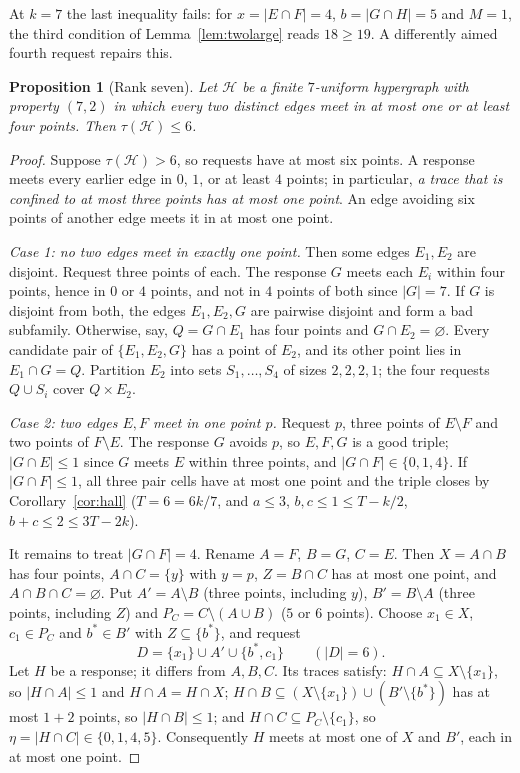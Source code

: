 \documentclass[11pt]{article}
\numberwithin{equation}{section}
\newtheorem{proposition}[theorem]{Proposition}
\theoremstyle{definition}
\theoremstyle{remark}
\newcommand{\HH}{\mathcal H}
\begin{document}
At $k=7$ the last inequality fails: for $x=|E\cap F|=4$, $b=|G\cap H|=5$
and $M=1$, the third condition of Lemma~\ref{lem:twolarge} reads
$18\ge19$. A differently aimed fourth request repairs this.

\begin{proposition}[Rank seven]\label{prop:rankseven}
Let $\HH$ be a finite $7$-uniform hypergraph with property $(7,2)$ in
which every two distinct edges meet in at most one or at least four
points. Then $\tau(\HH)\le6$.
\end{proposition}

\begin{proof}
Suppose $\tau(\HH)>6$, so requests have at most six points. A response
meets every earlier edge in $0$, $1$, or at least $4$ points; in
particular, \emph{a trace that is confined to at most three points has
at most one point}. An edge avoiding six points of another edge meets
it in at most one point.

\emph{Case 1: no two edges meet in exactly one point.} Then some edges
$E_1,E_2$ are disjoint. Request three points of each. The response $G$
meets each $E_i$ within four points, hence in $0$ or $4$ points, and not
in $4$ points of both since $|G|=7$. If $G$ is disjoint from both, the
edges $E_1,E_2,G$ are pairwise disjoint and form a bad subfamily.
Otherwise, say, $Q=G\cap E_1$ has four points and $G\cap E_2=\varnothing$.
Every candidate pair of $\{E_1,E_2,G\}$ has a point of $E_2$, and its
other point lies in $E_1\cap G=Q$. Partition $E_2$ into sets
$S_1,\dots,S_4$ of sizes $2,2,2,1$; the four requests $Q\cup S_i$ cover
$Q\times E_2$.

\emph{Case 2: two edges $E,F$ meet in one point $p$.} Request $p$, three
points of $E\setminus F$ and two points of $F\setminus E$. The response
$G$ avoids $p$, so $E,F,G$ is a good triple; $|G\cap E|\le1$ since $G$
meets $E$ within three points, and $|G\cap F|\in\{0,1,4\}$. If
$|G\cap F|\le1$, all three pair cells have at most one point and the
triple closes by Corollary~\ref{cor:hall} ($T=6=6k/7$, and
$a\le3$, $b,c\le1\le T-k/2$, $b+c\le2\le3T-2k$).

It remains to treat $|G\cap F|=4$. Rename $A=F$, $B=G$, $C=E$. Then
$X=A\cap B$ has four points, $A\cap C=\{y\}$ with $y=p$, $Z=B\cap C$ has
at most one point, and $A\cap B\cap C=\varnothing$. Put $A'=A\setminus B$
(three points, including $y$), $B'=B\setminus A$ (three points, including
$Z$) and $P_C=C\setminus(A\cup B)$ ($5$ or $6$ points). Choose
$x_1\in X$, $c_1\in P_C$ and $b^*\in B'$ with $Z\subseteq\{b^*\}$, and
request
\[
 D=\{x_1\}\cup A'\cup\{b^*,c_1\}\qquad(|D|=6).
\]
Let $H$ be a response; it differs from $A,B,C$. Its traces satisfy:
$H\cap A\subseteq X\setminus\{x_1\}$, so $|H\cap A|\le1$ and $H\cap A=H\cap X$;
$H\cap B\subseteq(X\setminus\{x_1\})\cup(B'\setminus\{b^*\})$ has at most
$1+2$ points, so $|H\cap B|\le1$; and $H\cap C\subseteq P_C\setminus\{c_1\}$,
so $\eta=|H\cap C|\in\{0,1,4,5\}$. Consequently $H$ meets at most one of
$X$ and $B'$, each in at most one point.


\end{proof}
\end{document}
